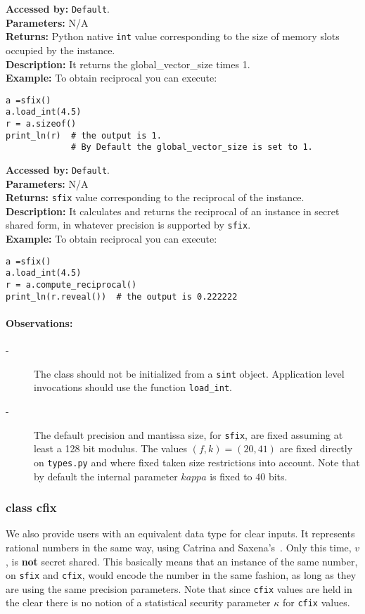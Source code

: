 		
			\textbf{Accessed by:} \verb|Default|.		 \\
			\textbf{Parameters:} N/A \\
			\textbf{Returns:}
				 Python native \verb|int| value corresponding to the size of memory slots occupied by the instance. \\
			\textbf{Description:}
				It returns the global_vector_size times 1. \\
	     	\textbf{Example:}
    		    To obtain reciprocal you can execute:
\begin{lstlisting}
a =sfix()
a.load_int(4.5)
r = a.sizeof()
print_ln(r)  # the output is 1. 
             # By Default the global_vector_size is set to 1.    	
\end{lstlisting}	 
			\textbf{Accessed by:} \verb|Default|.		 \\
			\textbf{Parameters:} N/A \\
			\textbf{Returns:} \verb|sfix| value corresponding to the reciprocal of the instance. \\
			\textbf{Description:}
				It calculates and returns the reciprocal of an instance in secret shared form, 
				in whatever precision is supported by \verb|sfix|.\\
	     	\textbf{Example:}
    		    To obtain reciprocal you can execute:
\begin{lstlisting}
a =sfix()
a.load_int(4.5)
r = a.compute_reciprocal()
print_ln(r.reveal())  # the output is 0.222222   	
\end{lstlisting}	 
	\paragraph{Observations:}
	\begin{description}
	\item[-] The class should not be initialized from a \verb|sint| object. 
    Application level invocations should use the function \verb|load_int|.
    \item[-] The default precision and mantissa size, for \verb|sfix|, are fixed assuming at least a 128 bit modulus. 
    The values $(f,k)=(20,41)$ are fixed directly on \verb|types.py| and where fixed taken size restrictions into account.
    Note that by default the internal parameter $kappa$ is fixed to $40$ bits. 
	\end{description}
	
\subsubsection{class cfix}
We also provide users with an equivalent data type for clear inputs. 
It represents rational numbers in the same way, using Catrina and Saxena's~\cite{CS10}.
Only this time, $v$, is \textbf{not} secret shared.  
This basically means that an instance of the same number, on \verb|sfix| and \verb|cfix|, 
would  encode the number in the same fashion, as long as they are using 
the same precision parameters.
Note that since \verb|cfix| values are held in the clear there is no notion
of a statistical security parameter $\kappa$ for \verb|cfix| values.

